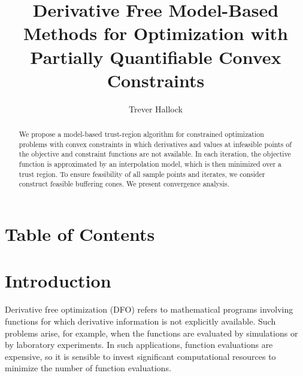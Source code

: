 \documentclass{article}
\title{Derivative Free Model-Based Methods for Optimization with Partially Quantifiable Convex Constraints}
\author{Trever Hallock}
\theoremstyle{case}
\numberwithin{theorem}{subsection}
\newcommand{\oalpha}{\tau_{\Delta}}
\begin{document}
\maketitle

\begin{abstract}

We propose a model-based trust-region algorithm for constrained optimization problems with convex constraints 
in which derivatives and values at infeasible points of the objective and constraint functions are not available.
In each iteration, the objective function is approximated by an interpolation model, which is then minimized over a trust region.
To ensure feasibility of all sample points and iterates, we consider construct feasible buffering cones.
We present convergence analysis.

\end{abstract}

\newpage

\section{Table of Contents}

\tableofcontents

\newpage






%
%








\section{Introduction}

Derivative free optimization (DFO) refers to mathematical programs involving functions for which derivative information is not explicitly available.
Such problems arise, for example, when the functions are evaluated by simulations or by laboratory experiments.
In such applications, function evaluations are expensive, so it is sensible to invest significant computational resources to minimize the number of function evaluations.
\end{document}
